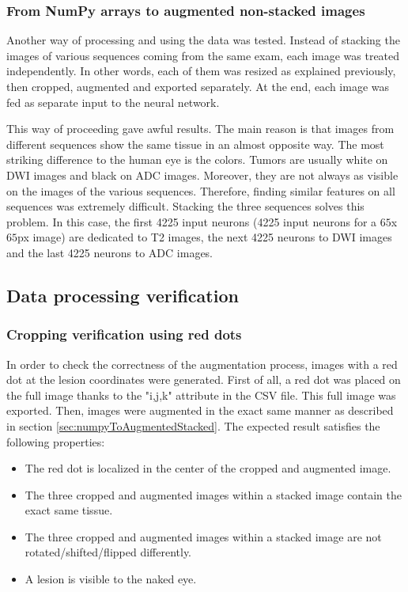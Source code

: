 \subsubsection{From NumPy arrays to augmented non-stacked images}
\setlength{\marginparwidth}{3cm}\leavevmode {}Another way of processing and using the data was tested. Instead of stacking the images of various sequences coming from the same exam, each image was treated independently. In other words, each of them was resized as explained previously, then cropped, augmented and exported separately. At the end, each image was fed as separate input to the neural network. 

This way of proceeding gave awful results. The main reason is that images from different sequences show the same tissue in an almost opposite way. The most striking difference to the human eye is the colors. Tumors are usually white on DWI images and black on ADC images. Moreover, they are not always as visible on the images of the various sequences. Therefore, finding similar features on all sequences was extremely difficult. Stacking the three sequences solves this problem. In this case, the first 4225 input neurons (4225 input neurons for a $65$x$65$px image) are dedicated to T2 images, the next 4225 neurons to DWI images and the last 4225 neurons to ADC images. 


\subsection{Data processing verification}
\label{sec:dataProcessingVerification}
\subsubsection{Cropping verification using red dots}
\setlength{\marginparwidth}{3cm}\leavevmode {}In order to check the correctness of the augmentation process, images with a red dot at the lesion coordinates were generated. First of all, a red dot was placed on the full image thanks to the "i,j,k" attribute in the CSV file. This full image was exported. Then, images were augmented in the exact same manner as described in section \ref{sec:numpyToAugmentedStacked}. The expected result satisfies the following properties:
\begin{itemize}
	\item The red dot is localized in the center of the cropped and augmented image.
	\item The three cropped and augmented images within a stacked image contain the exact same tissue. 
	\item The three cropped and augmented images within a stacked image are not rotated/shifted/flipped differently. 
	\item A lesion is visible to the naked eye. 
\end{itemize}

